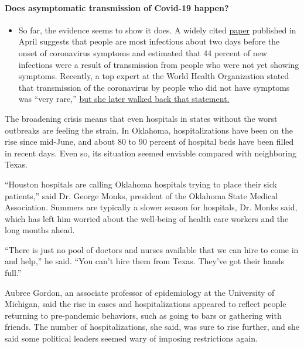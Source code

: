 \begin{itemize}
{  \paragraph{Does asymptomatic transmission of Covid-19
  happen?}\label{does-asymptomatic-transmission-of-covid-19-happen}}

  \begin{itemize}
  \tightlist
  \item
    So far, the evidence seems to show it does. A widely cited
    \href{https://www.nature.com/articles/s41591-020-0869-5}{paper}
    published in April suggests that people are most infectious about
    two days before the onset of coronavirus symptoms and estimated that
    44 percent of new infections were a result of transmission from
    people who were not yet showing symptoms. Recently, a top expert at
    the World Health Organization stated that transmission of the
    coronavirus by people who did not have symptoms was ``very rare,''
    \href{https://www.nytimes.com/2020/06/09/world/coronavirus-updates.html?action=click\&pgtype=Article\&state=default\&region=MAIN_CONTENT_3\&context=storylines_faq\#link-1f302e21}{but
    she later walked back that statement.}
  \end{itemize}
\end{itemize}

The broadening crisis means that even hospitals in states without the
worst outbreaks are feeling the strain. In Oklahoma, hospitalizations
have been on the rise since mid-June, and about 80 to 90 percent of
hospital beds have been filled in recent days. Even so, its situation
seemed enviable compared with neighboring Texas.

``Houston hospitals are calling Oklahoma hospitals trying to place their
sick patients,'' said Dr. George Monks, president of the Oklahoma State
Medical Association. Summers are typically a slower season for
hospitals, Dr. Monks said, which has left him worried about the
well-being of health care workers and the long months ahead.

``There is just no pool of doctors and nurses available that we can hire
to come in and help,'' he said. ``You can't hire them from Texas.
They've got their hands full.''

Aubree Gordon, an associate professor of epidemiology at the University
of Michigan, said the rise in cases and hospitalizations appeared to
reflect people returning to pre-pandemic behaviors, such as going to
bars or gathering with friends. The number of hospitalizations, she
said, was sure to rise further, and she said some political leaders
seemed wary of imposing restrictions again.

